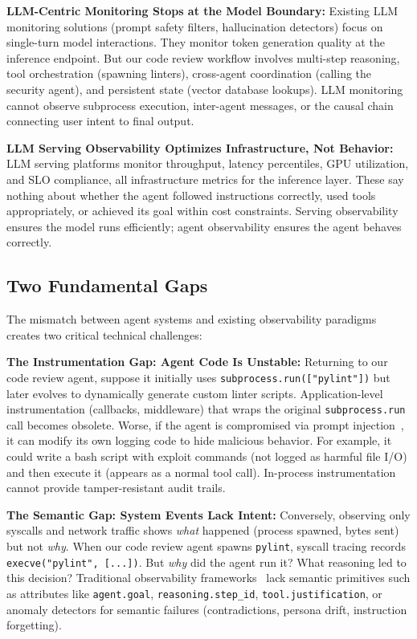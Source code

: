 \documentclass[sigplan,screen,9pt]{acmart}
\begin{document}
\textbf{LLM-Centric Monitoring Stops at the Model Boundary:} Existing LLM monitoring solutions (prompt safety filters, hallucination detectors) focus on single-turn model interactions. They monitor token generation quality at the inference endpoint. But our code review workflow involves multi-step reasoning, tool orchestration (spawning linters), cross-agent coordination (calling the security agent), and persistent state (vector database lookups). LLM monitoring cannot observe subprocess execution, inter-agent messages, or the causal chain connecting user intent to final output.

\textbf{LLM Serving Observability Optimizes Infrastructure, Not Behavior:} LLM serving platforms monitor throughput, latency percentiles, GPU utilization, and SLO compliance, all infrastructure metrics for the inference layer. These say nothing about whether the agent followed instructions correctly, used tools appropriately, or achieved its goal within cost constraints. Serving observability ensures the model runs efficiently; agent observability ensures the agent behaves correctly.

\subsection{Two Fundamental Gaps}

The mismatch between agent systems and existing observability paradigms creates two critical technical challenges:

\textbf{The Instrumentation Gap: Agent Code Is Unstable:} Returning to our code review agent, suppose it initially uses \texttt{subprocess.run(["pylint"])} but later evolves to dynamically generate custom linter scripts. Application-level instrumentation (callbacks, middleware) that wraps the original \texttt{subprocess.run} call becomes obsolete. Worse, if the agent is compromised via prompt injection~\cite{indirect-prompt-inject}, it can modify its own logging code to hide malicious behavior. For example, it could write a bash script with exploit commands (not logged as harmful file I/O) and then execute it (appears as a normal tool call). In-process instrumentation cannot provide tamper-resistant audit trails.

\textbf{The Semantic Gap: System Events Lack Intent:} Conversely, observing only syscalls and network traffic shows \emph{what} happened (process spawned, bytes sent) but not \emph{why}. When our code review agent spawns \texttt{pylint}, syscall tracing records \texttt{execve("pylint", [...])}. But \emph{why} did the agent run it? What reasoning led to this decision? Traditional observability frameworks~\cite{sigelman2010dapper,majors2017observability} lack semantic primitives such as attributes like \texttt{agent.goal}, \texttt{reasoning.step\_id}, \texttt{tool.justification}, or anomaly detectors for semantic failures (contradictions, persona drift, instruction forgetting).
\end{document}
